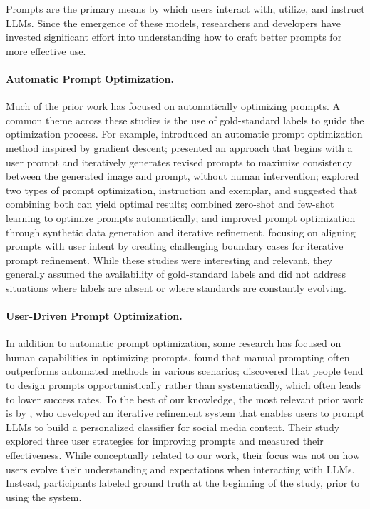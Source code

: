 Prompts are the primary means by which users interact with, utilize, and instruct LLMs. 
Since the emergence of these models, researchers and developers have invested significant effort into understanding how to craft better prompts for more effective use. 

\paragraph{Automatic Prompt Optimization.}
Much of the prior work has focused on automatically optimizing prompts. 
A common theme across these studies is the use of gold-standard labels to guide the optimization process.
For example, \citet{pryzant2023automatic} introduced an automatic prompt optimization method inspired by gradient descent; 
\citet{manas2024improving} presented an approach that begins with a user prompt and iteratively generates revised prompts to maximize consistency between the generated image and prompt, without human intervention; 
\citet{wan2024teach} explored two types of prompt optimization, instruction and exemplar, and suggested that combining both can yield optimal results; 
\citet{sun2023autohint} combined zero-shot and few-shot learning to optimize prompts automatically; %
and \citet{levi2024intent} improved prompt optimization through synthetic data generation and iterative refinement, focusing on aligning prompts with user intent by creating challenging boundary cases for iterative prompt refinement.
While these studies were interesting and relevant, they generally assumed the availability of gold-standard labels and did not address situations where labels are absent or where standards are constantly evolving.

\paragraph{User-Driven Prompt Optimization.}
In addition to automatic prompt optimization, some research has focused on human capabilities in optimizing prompts. 
\citet{zhou2023revisiting} found that manual prompting often outperforms automated methods in various scenarios; 
\citet{10.1145/3544548.3581388} discovered that people tend to design prompts opportunistically rather than systematically, which often leads to lower success rates. 
To the best of our knowledge, the most relevant prior work is by \citet{wang2024end}, who developed an iterative refinement system that enables users to prompt LLMs to build a personalized classifier for social media content. 
Their study explored three user strategies for improving prompts and measured their effectiveness. 
While conceptually related to our work, their focus was not on how users evolve their understanding and expectations when interacting with LLMs. 
Instead, participants labeled ground truth at the beginning of the study, prior to using the system.



